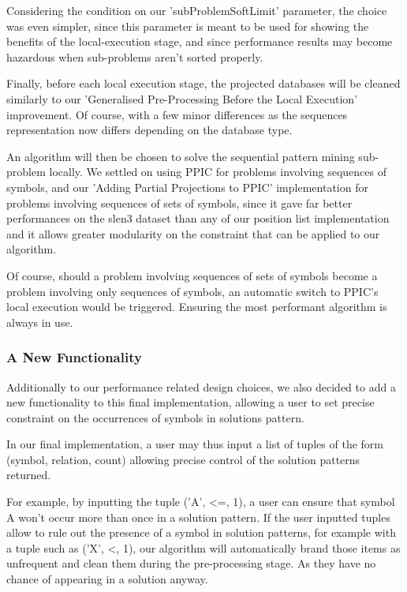 \documentclass{eplmastersthesis}
\begin{document}
Considering the condition on our 'subProblemSoftLimit' parameter, the choice was even simpler, since this parameter is meant to be used for showing the benefits of the local-execution stage, and since performance results may become hazardous when sub-problems aren't sorted properly. \newline

Finally, before each local execution stage, the projected databases will be cleaned similarly to our 'Generalised Pre-Processing Before the Local Execution' improvement. Of course, with a few minor differences as the sequences representation now differs depending on the database type. \newline

An algorithm will then be chosen to solve the sequential pattern mining sub-problem locally. We settled on using PPIC for problems involving sequences of symbols, and our 'Adding Partial Projections to PPIC' implementation for problems involving sequences of sets of symbols, since it gave far better performances on the slen3 dataset than any of our position list implementation and it allows greater modularity on the constraint that can be applied to our algorithm. \newline

Of course, should a problem involving sequences of sets of symbols become a problem involving only sequences of symbols, an automatic switch to PPIC's local execution would be triggered. Ensuring the most performant algorithm is always in use.

\subsubsection{A New Functionality}

Additionally to our performance related design choices, we also decided to add a new functionality to this final implementation, allowing a user to set precise constraint on the occurrences of symbols in solutions pattern. \newline

In our final implementation, a user may thus input a list of tuples of the form (symbol, relation, count) allowing precise control of the solution patterns returned. \newline

For example, by inputting the tuple ('A', <=, 1), a user can ensure that symbol A won't occur more than once in a solution pattern. If the user inputted tuples allow to rule out the presence of a symbol in solution patterns, for example with a tuple such as ('X', <, 1), our algorithm will automatically brand those items as unfrequent and clean them during the pre-processing stage. As they have no chance of appearing in a solution anyway. \newline
\end{document}
